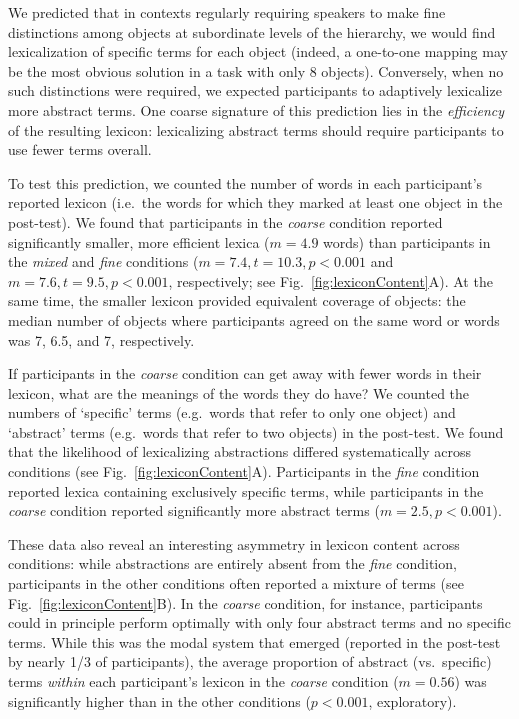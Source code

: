We predicted that in contexts regularly requiring speakers to make fine distinctions among objects at subordinate levels of the hierarchy, we would find lexicalization of specific terms for each object (indeed, a one-to-one mapping may be the most obvious solution in a task with only 8 objects). Conversely, when no such distinctions were required, we expected participants to adaptively lexicalize more abstract terms. One coarse signature of this prediction lies in the \emph{efficiency} of the resulting lexicon: lexicalizing abstract terms should require participants to use fewer terms overall.

To test this prediction, we counted the number of words in each participant's reported lexicon (i.e.\ the words for which they marked at least one object in the post-test). We found that participants in the \emph{coarse} condition reported significantly smaller, more efficient lexica ($m = 4.9$ words) than participants in the \emph{mixed} and \emph{fine} conditions ($m = 7.4, t = 10.3, p <0.001$ and $m = 7.6, t = 9.5, p < 0.001$, respectively; see Fig.\ \ref{fig:lexiconContent}A). At the same time, the smaller lexicon provided equivalent coverage of objects: the median number of objects where participants agreed on the same word or words was 7, 6.5, and 7, respectively. 


If participants in the \emph{coarse} condition can get away with fewer words in their lexicon, what are the meanings of the words they do have? We counted the numbers of `specific' terms (e.g.\ words that refer to only one object) and `abstract' terms (e.g.\ words that refer to two objects) in the post-test. We found that the likelihood of lexicalizing abstractions differed systematically across conditions (see Fig.\ \ref{fig:lexiconContent}A). Participants in the \emph{fine} condition reported lexica containing exclusively specific terms, while participants in the \emph{coarse} condition reported significantly more abstract terms ($m = 2.5, p < 0.001$). 

These data also reveal an interesting asymmetry in lexicon content across conditions: while abstractions are entirely absent from the \emph{fine} condition, participants in the other conditions often reported a mixture of terms (see Fig.\ \ref{fig:lexiconContent}B). In the \emph{coarse} condition, for instance, participants could in principle perform optimally with only four abstract terms and no specific terms. While this was the modal system that emerged (reported in the post-test by nearly 1/3 of participants), the average proportion of abstract (vs.\ specific) terms \emph{within} each participant's lexicon in the \emph{coarse} condition ($m = 0.56$) was significantly higher than in the other conditions ($p < 0.001$, exploratory).

